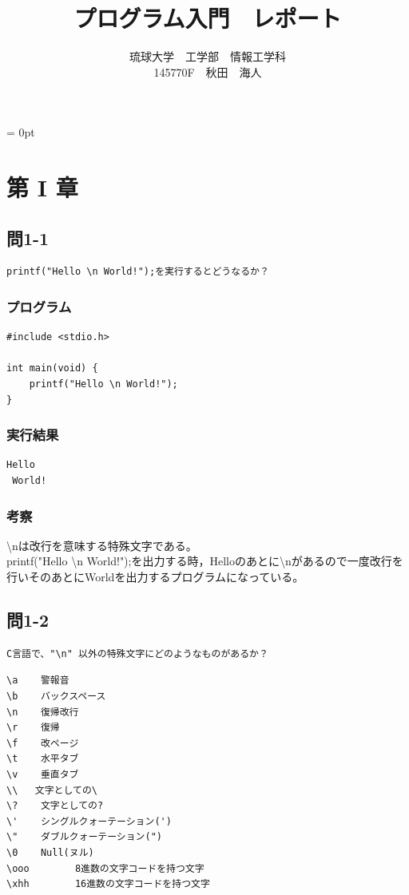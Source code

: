 \documentclass{jarticle}
\title{プログラム入門　レポート}
\author{琉球大学　工学部　情報工学科\\145770F　秋田　海人}
\date{}
\begin{document}
\maketitle
\parindent = 0pt


\section{第 I 章\\}
\subsection{問1-1\\}
\begin{verbatim}
printf("Hello \n World!");を実行するとどうなるか？
\end{verbatim}
\subsubsection{プログラム\\}
\begin{breakbox}
\begin{verbatim}
#include <stdio.h>

int main(void) {
	printf("Hello \n World!");
}
\end{verbatim}
\end{breakbox}
\subsubsection{実行結果\\}
\begin{breakbox}
\begin{verbatim}
Hello 
 World!
\end{verbatim}
\end{breakbox}
\subsubsection{考察\\}
\textbackslash{n}は改行を意味する特殊文字である。\\
printf("Hello \textbackslash{n} World!");を出力する時，Helloのあとに\textbackslash{n}があるので一度改行を行いそのあとにWorldを出力するプログラムになっている。\\
\newpage
\subsection{問1-2\\}
\begin{verbatim}
C言語で、"\n" 以外の特殊文字にどのようなものがあるか？
\end{verbatim}
\begin{breakbox}
\begin{verbatim}
\a    警報音
\b    バックスペース
\n    復帰改行
\r    復帰
\f    改ページ
\t    水平タブ
\v    垂直タブ
\\   文字としての\
\?    文字としての?
\'    シングルクォーテーション(')
\"    ダブルクォーテーション(")
\0    Null(ヌル)
\ooo	    8進数の文字コードを持つ文字
\xhh	    16進数の文字コードを持つ文字
\end{verbatim}
\end{breakbox}
\end{document}

